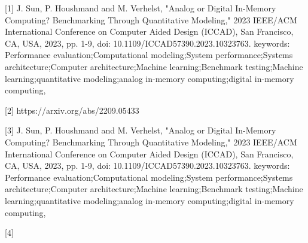 [1] J. Sun, P. Houshmand and M. Verhelst, "Analog or Digital In-Memory Computing? Benchmarking Through Quantitative Modeling," 2023 IEEE/ACM International Conference on Computer Aided Design (ICCAD), San Francisco, CA, USA, 2023, pp. 1-9, doi: 10.1109/ICCAD57390.2023.10323763. keywords: {Performance evaluation;Computational modeling;System performance;Systems architecture;Computer architecture;Machine learning;Benchmark testing;Machine learning;quantitative modeling;analog in-memory computing;digital in-memory computing},

[2] https://arxiv.org/abs/2209.05433

[3] J. Sun, P. Houshmand and M. Verhelst, "Analog or Digital In-Memory Computing? Benchmarking Through Quantitative Modeling," 2023 IEEE/ACM International Conference on Computer Aided Design (ICCAD), San Francisco, CA, USA, 2023, pp. 1-9, doi: 10.1109/ICCAD57390.2023.10323763. keywords: {Performance evaluation;Computational modeling;System performance;Systems architecture;Computer architecture;Machine learning;Benchmark testing;Machine learning;quantitative modeling;analog in-memory computing;digital in-memory computing},


[4] 